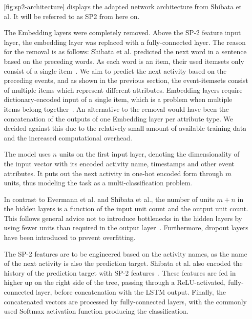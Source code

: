 \autoref{fig:sp2-architecture} displays the adapted network architecture from Shibata et al. It will be referred to as SP2 from here on.

The Embedding layers were completely removed. Above the SP-2 feature input layer, the embedding layer was replaced with a fully-connected layer. The reason for the removal is as follows: Shibata et al. predicted the next word in a sentence based on the preceding words. As each word is an item, their used itemsets only consist of a single item~\cite{shibata2016bipartite}. We aim to predict the next activity based on the preceding events, and as shown in the previous section, the event-itemsets consist of multiple items which represent different attributes.
Embedding layers require dictionary-encoded input of a single item, which is a problem when multiple items belong together~\cite{goldberg2014word2vec}. An alternative to the removal would have been the concatenation of the outputs of one Embedding layer per attribute type. We decided against this due to the relatively small amount of available training data and the increased computational overhead.

The model uses $n$ units on the first input layer, denoting the dimensionality of the input vector with its encoded activity name, timestamps and other event attributes. It puts out the next activity in one-hot encoded form through $m$ units, thus modeling the task as a multi-classification problem.

In contrast to Evermann et al. and Shibata et al., the number of units $m+n$ in the hidden layers is a function of the input unit count and the output unit count. This follows general advice not to introduce bottlenecks in the hidden layers by using fewer units than required in the output layer~\cite{web:techniques-in-convnets,szegedy2016rethinking}. Furthermore, dropout layers have been introduced to prevent overfitting.

The SP-2 features are to be engineered based on the activity names, as the name of the next activity is also the prediction target. Shibata et al. also encoded the history of the prediction target with SP-2 features~\cite{shibata2016bipartite}. These features are fed in higher up on the right side of the tree, passing through a ReLU-activated, fully-connected layer, before concatenation with the LSTM output. Finally, the concatenated vectors are processed by fully-connected layers, with the commonly used Softmax activation function producing the classification.

